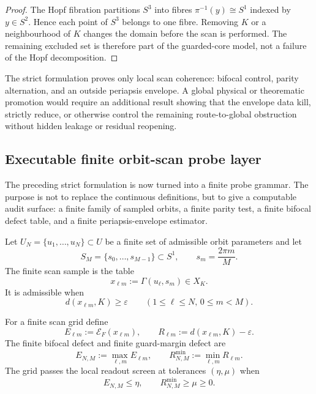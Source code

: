\begin{proof}
The Hopf fibration partitions $S^3$ into fibres $\pi^{-1}(y)\cong S^1$ indexed by $y\in S^2$.  Hence each point of $S^3$ belongs to one fibre.  Removing $K$ or a neighbourhood of $K$ changes the domain before the scan is performed.  The remaining excluded set is therefore part of the guarded-core model, not a failure of the Hopf decomposition.
\end{proof}

\begin{remark}
\label{rem:strict-orbit-scan-promotion-guard}
The strict formulation proves only local scan coherence: bifocal control, parity alternation, and an outside periapsis envelope.  A global physical or theorematic promotion would require an additional result showing that the envelope data kill, strictly reduce, or otherwise control the remaining route-to-global obstruction without hidden leakage or residual reopening.
\end{remark}


\subsection{Executable finite orbit-scan probe layer}
\label{subsec:executable-finite-orbit-scan-probe-layer}

The preceding strict formulation is now turned into a finite probe grammar.  The purpose is not to replace the continuous definitions, but to give a computable audit surface: a finite family of sampled orbits, a finite parity test, a finite bifocal defect table, and a finite periapsis-envelope estimator.

\begin{definition}
\label{def:finite-scan-grid}
Let $U_N=\{u_1,\ldots,u_N\}\subset U$ be a finite set of admissible orbit parameters and let
\[
S_M=\{s_0,\ldots,s_{M-1}\}\subset S^1,
\qquad
s_m=\frac{2\pi m}{M}.
\]
The finite scan sample is the table
\[
x_{\ell m}:=\Gamma(u_\ell,s_m)\in X_K.
\]
It is admissible when
\[
d(x_{\ell m},K)\geq\varepsilon
\qquad
(1\leq \ell\leq N,\,0\leq m<M).
\]
\end{definition}

\begin{definition}
\label{def:finite-bifocal-guarded-distance-registers}
For a finite scan grid define
\[
E_{\ell m}:=\mathcal E_F(x_{\ell m}),
\qquad
R_{\ell m}:=d(x_{\ell m},K)-\varepsilon .
\]
The finite bifocal defect and finite guard-margin defect are
\[
E_{N,M}:=\max_{\ell,m}E_{\ell m},
\qquad
R_{N,M}^{\min}:=\min_{\ell,m}R_{\ell m}.
\]
The grid passes the local readout screen at tolerances $(\eta,\mu)$ when
\[
E_{N,M}\leq\eta,
\qquad
R_{N,M}^{\min}\geq\mu\geq0.
\]
\end{definition}


